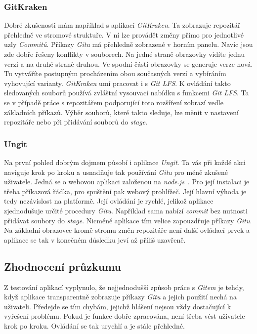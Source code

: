         \subsubsection{GitKraken~}
        Dobré zkušenosti mám například s aplikací \emph{GitKraken}. Ta zobrazuje repozitář přehledně ve stromové struktuře. V ní lze provádět změny přímo pro jednotlivé uzly \emph{Commitů}. Příkazy \emph{Gitu} má přehledně zobrazené v horním panelu. Navíc jsou zde dobře řešeny konflikty v souborech. Na jedné straně obrazovky vidíte jednu verzi a na druhé straně druhou. Ve spodní části obrazovky se generuje verze nová. Tu vytváříte postupným procházením obou současných verzí a vybíráním vyhovující varianty. \emph{GitKraken} umí pracovat i s \emph{Git LFS}. K ovládání takto sledovaných souborů používá zvláštní vysouvací nabídku s funkcemi \emph{Git LFS}. Ta se v případě práce s repozitářem podporující toto rozšíření zobrazí vedle základních příkazů. Výběr souborů, které takto sleduje, lze měnit v nastavení repozitáře nebo při přidávání souborů do \emph{stage}.

        \subsubsection{Ungit~}
        Na první pohled dobrým dojmem působí i aplikace \emph{Ungit}. Ta vás při každé akci naviguje krok po kroku a usnadňuje tak používání \emph{Gitu} pro méně zkušené uživatele. Jedná se o webovou aplikaci založenou na \emph{node.js}~. Pro její instalaci je třeba příkazová řádka, pro spuštění pak webový prohlížeč. Její hlavní výhoda je tedy nezávislost na platformě. Její ovládání je rychlé, jelikož aplikace zjednodušuje určité procedury \emph{Gitu}. Například sama nabízí \emph{commit} bez nutnosti přidávat soubory do \emph{stage}. Nicméně aplikace tím velice zapouzdřuje příkazy \emph{Gitu}. Na základní obrazovce kromě stromu změn repozitáře není další ovládací prvek a aplikace se tak v konečném důsledku jeví až příliš uzavřeně.

    \subsection{Zhodnocení průzkumu}
    Z testování aplikací vyplynulo, že nejjednodušší způsob práce s \emph{Gitem} je tehdy, když aplikace transparentně zobrazuje příkazy \emph{Gitu} a jejich použití nechá na uživateli. Předejde se tím chybám, jejichž hlášení nejsou vždy dostačující k vyřešení problému. Pokud je funkce dobře zpracována, není třeba vést uživatele krok po kroku. Ovládání se tak urychlí a je stále přehledné.

